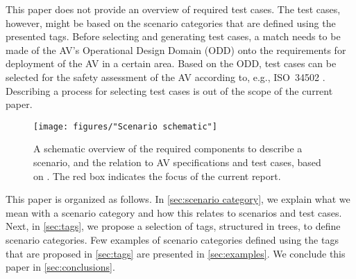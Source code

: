 This paper does not provide an overview of required test cases. The test cases, however, might be based on the scenario categories that are defined using the presented tags. Before selecting and generating test cases, a match needs to be made of the AV's Operational Design Domain (ODD) \autocite{sae2018j3016} onto the requirements for deployment of the AV in a certain area. %
Based on the ODD, test cases can be selected for the safety assessment of the AV according to, e.g., ISO~34502 \autocite{ISO34502}. Describing a process for selecting test cases is out of the scope of the current paper. 

\begin{figure*}[t]
	\centering
	\texttt{[image: figures/"Scenario schematic"]}	
	\caption{A schematic overview of the required components to describe a scenario, and the relation to AV specifications and test cases, based on \cite{elrofai2018scenario}. The red box indicates the focus of the current report.}
	\label{fig:scenario schematic}
\end{figure*}

This paper is organized as follows. In \cref{sec:scenario category}, we explain what we mean with a scenario category and how this relates to scenarios and test cases. Next, in \cref{sec:tags}, we propose a selection of tags, structured in trees, to define scenario categories. Few examples of scenario categories defined using the tags that are proposed in \cref{sec:tags} are presented in \cref{sec:examples}. We conclude this paper in \cref{sec:conclusions}.
